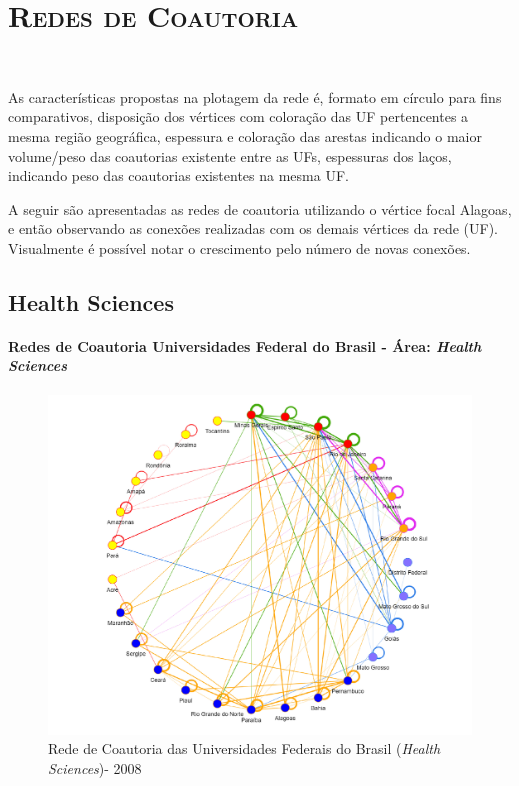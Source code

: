 \chapter{\textsc{Redes de Coautoria}}~\label{redes}

As características propostas na plotagem da rede é, formato em círculo para fins comparativos, disposição dos vértices com coloração das UF pertencentes a mesma região geográfica, espessura e coloração das arestas indicando o maior volume/peso das coautorias existente entre as UFs, espessuras dos laços, indicando peso das coautorias existentes na mesma UF.

A seguir são apresentadas as redes de coautoria utilizando o vértice focal Alagoas, e então observando as conexões realizadas com os demais vértices da rede (UF). Visualmente é possível notar o crescimento pelo número de novas conexões.



\section{\textbf{Health Sciences}}

\subsubsection{Redes de Coautoria Universidades Federal do Brasil - Área: \textit{Health Sciences}}


\begin{figure}[H]
	\centering
	\includegraphics[scale=0.6]{Imagens/rede-2008.pdf}
	\caption{Rede de Coautoria das Universidades Federais do Brasil (\textit{Health Sciences})- 2008}
	\label{Rede de Coautoria - UF BR 2008}
\end{figure}

